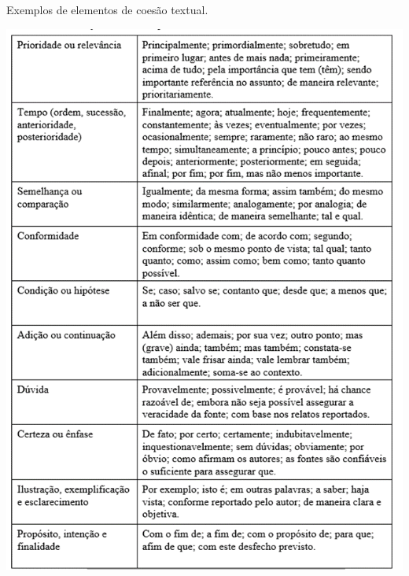 \begin{enumerate}[label=\alph*)]
    \begin{quadro}[h!]
        \caption{Exemplos de elementos de coesão textual.}
        \centering
		\includegraphics[scale=0.8]{imagens/quadro2.png}
	    \label{qd:grandezas}
    \end{quadro}

\end{enumerate}